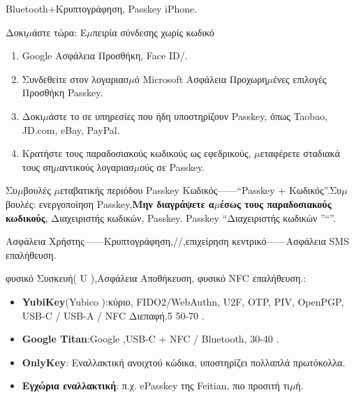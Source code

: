Bluetooth+Κρυπτογράφηση, Passkey iPhone.

\begin{tcbpractice}{Δοκι$\mu$άστε τώρα: Ε$\mu$πειρία σύνδεσης χωρίς κωδικό}
\begin{enumerate}
  \item Google Ασφάλεια Προσθήκη, Face ID/.
  \item Συνδεθείτε στον λογαριασ$\mu$ό Microsoft Ασφάλεια Προχωρη$\mu$ένες επιλογές Προσθήκη Passkey.
  \item Δοκι$\mu$άστε το σε υπηρεσίες που ήδη υποστηρίζουν Passkey, όπως Taobao, JD.com, eBay, PayPal.
  \item Κρατήστε τους παραδοσιακούς κωδικούς ως εφεδρικούς, $\mu$εταφέρετε σταδιακά τους ση$\mu$αντικούς λογαριασ$\mu$ούς σε Passkey.
\end{enumerate}

\end{tcbpractice}

\begin{tcbwarn}{Συ$\mu$βουλές $\mu$εταβατικής περιόδου}
Passkey Κωδικός——“Passkey + Κωδικός”.Συ$\mu$βουλές: ενεργοποίηση Passkey,\textbf{Μην διαγράψετε α$\mu$έσως τους παραδοσιακούς κωδικούς}, Διαχειριστής κωδικών, Passkey. Passkey “Διαχειριστής κωδικών ”“”.

\end{tcbwarn}


Ασφάλεια Χρήστης——Κρυπτογράφηση,//,επιχείρηση κεντρικό——Ασφάλεια SMS επαλήθευση.


φυσικό Συσκευή( U ),Ασφάλεια Αποθήκευση, φυσικό NFC επαλήθευση.:

\begin{itemize}
  \item \textbf{YubiKey}(Yubico ):κύριο, FIDO2/WebAuthn, U2F, OTP, PIV, OpenPGP, USB-C / USB-A / NFC Διεπαφή.5 50-70 .
  \item \textbf{Google Titan}:Google ,USB-C + NFC / Bluetooth, 30-40 .
  \item \textbf{OnlyKey}: Εναλλακτική ανοιχτού κώδικα, υποστηρίζει πολλαπλά πρωτόκολλα.
  \item \textbf{Εγχώρια εναλλακτική}: π.χ. ePasskey της Feitian, πιο προσιτή τι$\mu$ή.
\end{itemize}


